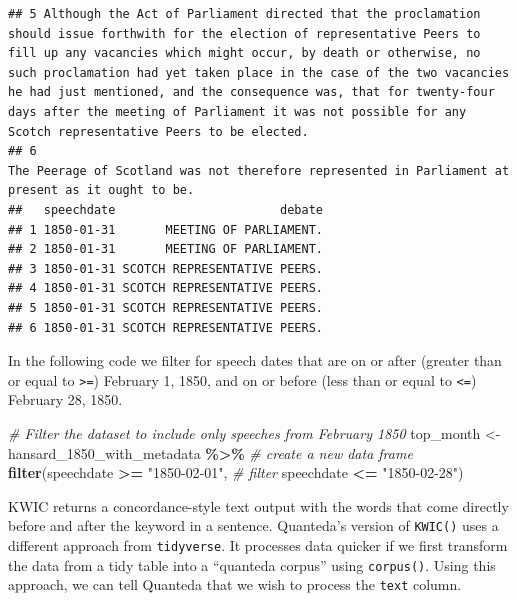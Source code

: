 \documentclass[
]{article}
\newenvironment{Shaded}{\begin{snugshade}}{\end{snugshade}}
\newcommand{\CommentTok}[1]{\textcolor[rgb]{0.56,0.35,0.01}{\textit{#1}}}
\newcommand{\FunctionTok}[1]{\textcolor[rgb]{0.13,0.29,0.53}{\textbf{#1}}}
\newcommand{\NormalTok}[1]{#1}
\newcommand{\OtherTok}[1]{\textcolor[rgb]{0.56,0.35,0.01}{#1}}
\newcommand{\SpecialCharTok}[1]{\textcolor[rgb]{0.81,0.36,0.00}{\textbf{#1}}}
\newcommand{\StringTok}[1]{\textcolor[rgb]{0.31,0.60,0.02}{#1}}
\begin{document}
\begin{verbatim}
## 5 Although the Act of Parliament directed that the proclamation should issue forthwith for the election of representative Peers to fill up any vacancies which might occur, by death or otherwise, no such proclamation had yet taken place in the case of the two vacancies he had just mentioned, and the consequence was, that for twenty-four days after the meeting of Parliament it was not possible for any Scotch representative Peers to be elected.
## 6                                                                                                                                                                                                                                                                                                                                                           The Peerage of Scotland was not therefore represented in Parliament at present as it ought to be.
##   speechdate                       debate
## 1 1850-01-31       MEETING OF PARLIAMENT.
## 2 1850-01-31       MEETING OF PARLIAMENT.
## 3 1850-01-31 SCOTCH REPRESENTATIVE PEERS.
## 4 1850-01-31 SCOTCH REPRESENTATIVE PEERS.
## 5 1850-01-31 SCOTCH REPRESENTATIVE PEERS.
## 6 1850-01-31 SCOTCH REPRESENTATIVE PEERS.
\end{verbatim}

In the following code we filter for speech dates that are on or after
(greater than or equal to \texttt{\textgreater{}=}) February 1, 1850,
and on or before (less than or equal to \texttt{\textless{}=}) February
28, 1850.

\begin{Shaded}
\begin{Highlighting}[]
\CommentTok{\# Filter the dataset to include only speeches from February 1850}
\NormalTok{top\_month }\OtherTok{\textless{}{-}}\NormalTok{ hansard\_1850\_with\_metadata }\SpecialCharTok{\%\textgreater{}\%} \CommentTok{\# create a new data frame}
  \FunctionTok{filter}\NormalTok{(speechdate }\SpecialCharTok{\textgreater{}=} \StringTok{"1850{-}02{-}01"}\NormalTok{, }\CommentTok{\# filter}
\NormalTok{         speechdate }\SpecialCharTok{\textless{}=} \StringTok{"1850{-}02{-}28"}\NormalTok{)}
\end{Highlighting}
\end{Shaded}

KWIC returns a concordance-style text output with the words that come
directly before and after the keyword in a sentence. Quanteda's version
of \texttt{KWIC()} uses a different approach from \texttt{tidyverse}. It
processes data quicker if we first transform the data from a tidy table
into a ``quanteda corpus'' using \texttt{corpus()}. Using this approach,
we can tell Quanteda that we wish to process the \texttt{text} column.
\end{document}
